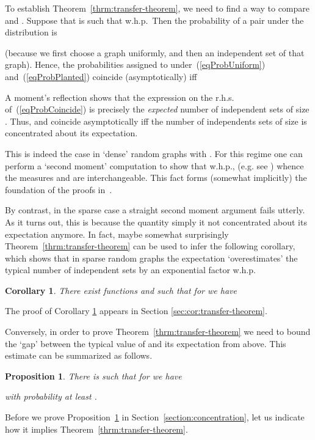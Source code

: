 \documentclass[a4paper,10pt]{article}
\newtheorem{proposition}{Proposition}\renewcommand{\theproposition}{\arabic{proposition}}
\newtheorem{corollary}{Corollary}\renewcommand{\thecorollary}{\arabic{corollary}}
\newcommand{\whp}{w.h.p.}
\newcommand\Prop{Proposition}
\newcommand\Thm{Theorem}
\newcommand\Sec{Section}
\begin{document}
To establish \Thm~\ref{thrm:transfer-theorem}, we need to find
a way to compare  and . Suppose that
 is such that  \whp\
Then the probability of a pair 
under the distribution  is

(because we first choose a graph uniformly, and then an independent
set of that graph). Hence, the probabilities assigned to 
under~(\ref{eqProbUniform}) and~(\ref{eqProbPlanted}) coincide
(asymptotically) iff

A moment's reflection shows that the expression on the r.h.s.
of~(\ref{eqProbCoincide}) is precisely the \emph{expected}
number  of independent sets of size .
Thus,  and  coincide asymptotically iff
the number  of independents sets of size  is
concentrated about its expectation.


This is indeed the case in `dense' random graphs with .
For this regime one can perform a `second moment' computation to show
that  \whp, (e.g. see \cite[Chapter~7]{janson}) 
whence the measures  and  are interchangeable.
This fact forms (somewhat implicitly) the foundation of the proofs
in~\cite{jerrum-planted}.



By contrast, in the sparse case  a straight second
moment argument fails utterly. As it turns out, this is because
the quantity  simply it not concentrated about
its expectation anymore. In fact, maybe somewhat surprisingly
\Thm~\ref{thrm:transfer-theorem} can be used to infer the following
corollary, which shows that in sparse random graphs the expectation
 `overestimates' the typical number of independent
sets by an exponential factor \whp\

\begin{corollary}\label{cor:transfer-theorem}
There exist functions  and  such that for
 we have

\end{corollary}
The proof of Corollary \ref{cor:transfer-theorem} appears in Section
\ref{sec:cor:transfer-theorem}.


Conversely, in order to prove \Thm~\ref{thrm:transfer-theorem} we
need to bound the `gap' between the typical value of 
and its expectation from above. This estimate can be summarized as
follows.


\begin{proposition}\label{Lemma_gap}
There is  such that for  we have

with probability at least .
\end{proposition}
Before we prove \Prop~\ref{Lemma_gap} in \Sec~\ref{section:concentration},
let us indicate how it implies \Thm~\ref{thrm:transfer-theorem}.
\end{document}
